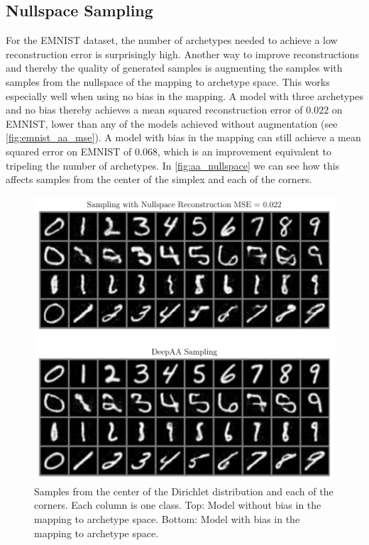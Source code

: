 \subsection{Nullspace Sampling}%
\label{sub:nullspace_sampling}

For the EMNIST dataset, the number of archetypes needed to achieve a low
reconstruction error is surprisingly high. Another way to improve
reconstructions and thereby the quality of generated samples is augmenting the
samples with samples from the nullspace of the mapping to archetype space. This
works especially well when using no bias in the mapping. A model with three
archetypes and no bias thereby achieves a mean squared reconstruction error of
$0.022$ on EMNIST, lower than any of the models achieved without augmentation
(see \autoref{fig:emnist_aa_mse}). A model with bias in the mapping can still
achieve a mean squared error on EMNIST of $0.068$, which is an improvement
equivalent to tripeling the number of archetypes. In \autoref{fig:aa_nullspace}
we can see how this affects samples from the center of the simplex and each of
the corners.
\begin{figure}[htpb]
	\centering
		\includegraphics{figures/samples/aa_nullspace.pdf}
	\caption{Samples from the center of the Dirichlet distribution and each
		of the corners. Each column is one class. Top: Model without bias in
		the mapping to archetype space. Bottom: Model with bias in the mapping to
		archetype space.}%
	\label{fig:aa_nullspace}
\end{figure}
